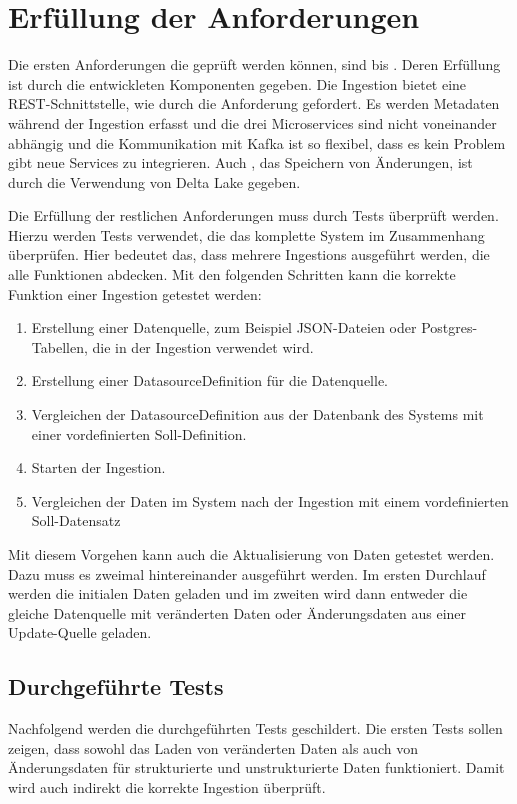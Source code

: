 \section{Erfüllung der Anforderungen}

Die ersten Anforderungen die geprüft werden können, sind  bis .
Deren Erfüllung ist durch die entwickleten Komponenten gegeben.
Die Ingestion bietet eine REST-Schnittstelle, wie durch die Anforderung gefordert.
Es werden Metadaten während der Ingestion erfasst und die drei Microservices sind nicht voneinander abhängig und die Kommunikation mit Kafka ist so flexibel, dass es kein Problem gibt neue Services zu integrieren.
Auch , das Speichern von Änderungen, ist durch die Verwendung von Delta Lake gegeben.

Die Erfüllung der restlichen Anforderungen muss durch Tests überprüft werden.
Hierzu werden Tests verwendet, die das komplette System im Zusammenhang überprüfen.
Hier bedeutet das, dass mehrere Ingestions ausgeführt werden, die alle Funktionen abdecken.
Mit den folgenden Schritten kann die korrekte Funktion einer Ingestion getestet werden: \begin{enumerate}
    \item Erstellung einer Datenquelle, zum Beispiel JSON-Dateien oder Postgres-Ta\-bellen, die in der Ingestion verwendet wird.
    \item Erstellung einer DatasourceDefinition für die Datenquelle.
    \item Vergleichen der DatasourceDefinition aus der Datenbank des Systems mit einer vordefinierten Soll-Definition.
    \item Starten der Ingestion.
    \item Vergleichen der Daten im System nach der Ingestion mit einem vordefinierten Soll-Datensatz
\end{enumerate}
Mit diesem Vorgehen kann auch die Aktualisierung von Daten getestet werden.
Dazu muss es zweimal hintereinander ausgeführt werden.
Im ersten Durchlauf werden die initialen Daten geladen und im zweiten wird dann entweder die gleiche Datenquelle mit veränderten Daten oder Änderungsdaten aus einer Update-Quelle geladen.

\subsection{Durchgeführte Tests}
\label{sec:tests-actual}
Nachfolgend werden die durchgeführten Tests geschildert.
Die ersten Tests sollen zeigen, dass sowohl das Laden von veränderten Daten als auch von Änderungsdaten für strukturierte und unstrukturierte Daten funktioniert.
Damit wird auch indirekt die korrekte Ingestion überprüft.

